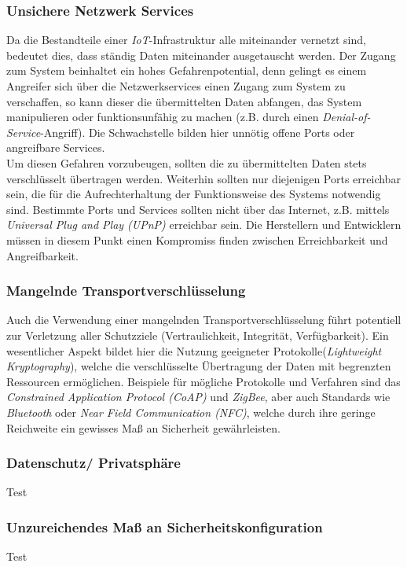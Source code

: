 \documentclass[conference]{IEEEtran}
\begin{document}
\subsubsection{Unsichere Netzwerk Services}
Da die Bestandteile einer \textit{IoT}-Infrastruktur alle miteinander vernetzt sind, bedeutet dies, dass ständig Daten miteinander ausgetauscht werden. Der Zugang zum System beinhaltet ein hohes Gefahrenpotential, denn gelingt es einem Angreifer sich über die Netzwerkservices einen Zugang zum System zu verschaffen, so kann dieser  die übermittelten Daten abfangen, das System manipulieren oder funktionsunfähig zu machen (z.B. durch einen \textit{Denial-of-Service}-Angriff). Die Schwachstelle bilden hier unnötig offene Ports oder angreifbare Services. \\
Um diesen Gefahren vorzubeugen, sollten die zu übermittelten Daten stets verschlüsselt übertragen werden. Weiterhin sollten nur diejenigen Ports erreichbar sein, die für die Aufrechterhaltung der Funktionsweise des Systems notwendig sind. Bestimmte Ports und Services sollten nicht über das Internet, z.B. mittels \textit{Universal Plug and Play (UPnP)} erreichbar sein\cite{owasp}. Die Herstellern und Entwicklern müssen in diesem Punkt einen Kompromiss finden zwischen Erreichbarkeit und Angreifbarkeit. \\
\subsubsection{Mangelnde Transportverschlüsselung}
Auch die Verwendung einer mangelnden Transportverschlüsselung führt potentiell zur Verletzung aller Schutzziele (Vertraulichkeit, Integrität, Verfügbarkeit). Ein wesentlicher Aspekt bildet hier die Nutzung geeigneter Protokolle(\textit{Lightweight Kryptography}), welche die verschlüsselte Übertragung der Daten mit begrenzten Ressourcen ermöglichen. Beispiele für mögliche Protokolle und Verfahren sind das \textit{Constrained Application
Protocol (CoAP)} und \textit{ZigBee}, aber auch Standards wie \textit{Bluetooth} oder \textit{Near Field Communication (NFC)}, welche durch ihre geringe Reichweite ein gewisses Maß an Sicherheit gewährleisten\cite{lowpow}\cite{zigbee}.\\
\subsubsection{Datenschutz/ Privatsphäre}
Test\\
\subsubsection{Unzureichendes Maß an Sicherheitskonfiguration}
Test\\
\end{document}
